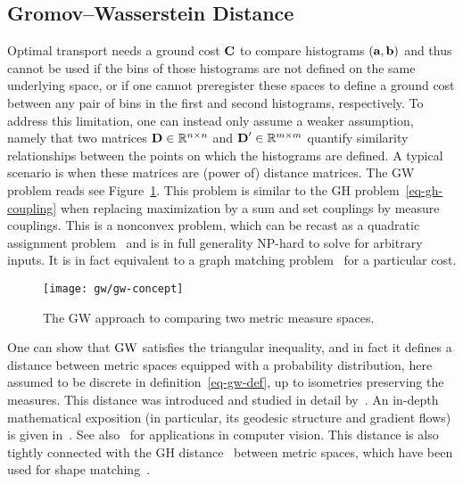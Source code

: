 \subsection{Gromov--Wasserstein Distance}

Optimal transport needs a ground cost $\mathrm{\textbf{C}}$ to compare histograms $(\mathrm{\textbf{a}},\mathrm{\textbf{b}})$ and thus cannot be used if the bins of those histograms are not defined on the same underlying space, or if one cannot preregister these spaces to define a ground cost between any pair of bins in the first and second histograms, respectively. 
%
To address this limitation, one can instead only assume a weaker assumption, namely that two matrices $\mathrm{\textbf{D}} \in \mathbb{R}^{n \times n}$ and $\mathrm{\textbf{D}}' \in \mathbb{R}^{m \times m}$ quantify similarity relationships between the points on which the histograms are defined. A typical scenario is when these matrices are (power of) distance matrices.
%
The GW problem reads
see Figure~\ref{fig-gw}.
%
This problem is similar to the GH problem~\eqref{eq-gh-coupling} when replacing maximization by a sum and set couplings by measure couplings.
%
This is a nonconvex problem, which can be recast as a quadratic assignment problem~\citep{loiola-2007} and is in full generality NP-hard to solve for arbitrary inputs. 
%
It is in fact equivalent to a graph matching problem~\citep{lyzinski-2015} for a particular cost.



\begin{figure}[h!]
\centering
\texttt{[image: gw/gw-concept]}
\caption{\label{fig-gw}
The GW approach to comparing two metric measure spaces.  
}
\end{figure}

One can show that $\operatorname{\mathrm{GW}}$ satisfies the triangular inequality, and in fact it defines a distance between metric spaces equipped with a probability distribution, here assumed to be discrete in definition~\eqref{eq-gw-def}, up to isometries preserving the measures.
%
This distance was introduced and studied in detail by~\citet{memoli-2011}. An in-depth mathematical exposition (in particular, its geodesic structure and gradient flows) is given in~\citep{SturmGW}. See also~\citep{schmitzer2013modelling} for applications in computer vision.
%
This distance is also tightly connected with the GH distance~\citep{gromov-2001} between metric spaces, which have been used for shape matching~\citep{memoli-2007,bronstein-2010}. 



